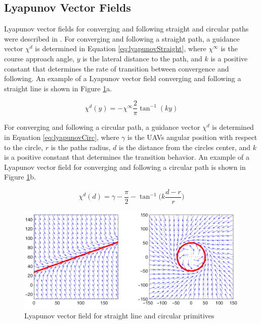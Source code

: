 \documentclass[numbered,pdftex]{ohio-etd}
\begin{document}
\subsection{Lyapunov Vector Fields}



Lyapunov vector fields for converging and following straight and circular paths were described in \cite{nelson_cooperative_2005}. For converging and following a straight path, a guidance vector $\chi^{d}$ is determined in Equation \ref{eq:lyapunovStraight}, where $\chi^{\infty}$ is the course approach angle, $y$ is the lateral distance to the path, and $k$ is a positive constant that determines the rate of transition between convergence and following. An example of a Lyapunov vector field converging and following a straight line is shown in Figure \ref{fig:vfPathPrimitives}a.




\begin{equation}\label{eq:lyapunovStraight}
\chi^d(y) = -\chi^{\infty}\frac{2}{\pi}\tan^{-1}(ky)
\end{equation}



For converging and following a circular path, a guidance vector $\chi^{d}$ is determined in Equation \ref{eq:lyapunovCirc}, where $\gamma$ is the UAVs angular position with respect to the circle, $r$ is the paths radius, $d$ is the distance from the circles center, and $k$ is a positive constant that determines the transition behavior. An example of a Lyapunov vector field for converging and following a circular path is shown in Figure \ref{fig:vfPathPrimitives}b.

\begin{equation}\label{eq:lyapunovCirc}
\chi^d(d) = \gamma-\frac{\pi}{2}-\tan^{-1} \bigg(k \frac{d-r}{r} \bigg)
\end{equation}


\begin{figure}
	\centering
	\includegraphics[width=13cm]{PaperFigures/nelsonLyapunov}
	\caption{Lyapunov vector field for straight line and circular primitives \cite{nelson_cooperative_2005}}
	\label{fig:vfPathPrimitives}
\end{figure}
\end{document}
